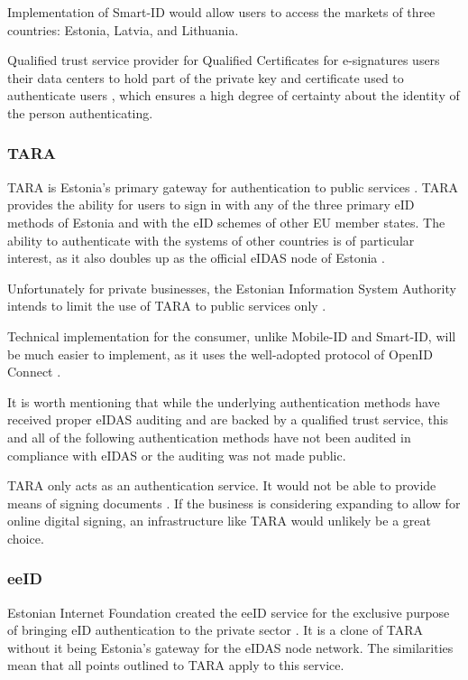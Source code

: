 Implementation of Smart-ID would allow users to access the markets of three countries: Estonia, Latvia, and Lithuania.

Qualified trust service provider for Qualified Certificates for e-signatures users their data centers to hold part of the private key and certificate used to authenticate users \cite{eu-trustservices}, which ensures a high degree of certainty about the identity of the person authenticating.

\subsubsection{TARA}

TARA is Estonia's primary gateway for authentication to public services \cite{tara}. TARA provides the ability for users to sign in with any of the three primary eID methods of Estonia and with the eID schemes of other EU member states. The ability to authenticate with the systems of other countries is of particular interest, as it also doubles up as the official eIDAS node of Estonia \cite{tara}.

Unfortunately for private businesses, the Estonian Information System Authority intends to limit the use of TARA to public services only \cite{tara-business}.

Technical implementation for the consumer, unlike Mobile-ID and Smart-ID, will be much easier to implement, as it uses the well-adopted protocol of OpenID Connect \cite{tara-technical, oidc}.

It is worth mentioning that while the underlying authentication methods have received proper eIDAS auditing and are backed by a qualified trust service, this and all of the following authentication methods have not been audited in compliance with eIDAS or the auditing was not made public.

TARA only acts as an authentication service. It would not be able to provide means of signing documents \cite{tara-technical}. If the business is considering expanding to allow for online digital signing, an infrastructure like TARA would unlikely be a great choice.

\subsubsection{eeID}

Estonian Internet Foundation created the eeID service for the exclusive purpose of bringing eID authentication to the private sector \cite{eeid}. It is a clone of TARA without it being Estonia's gateway for the eIDAS node network. The similarities mean that all points outlined to TARA apply to this service.

